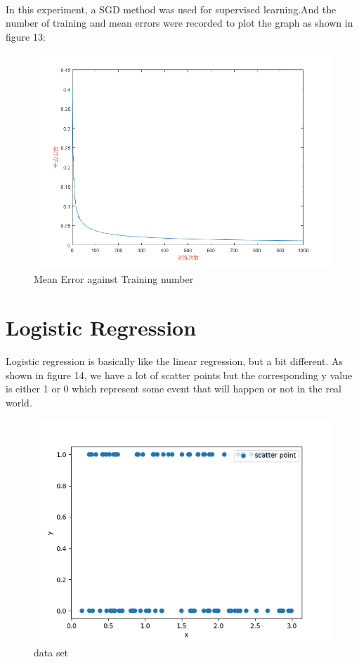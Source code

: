 \documentclass[a4paper,12pt]{article}
\begin{document}
\begin{spacing}{2}
\paragraph{ }In this experiment, a SGD method was used for supervised learning.And the number of training and mean errors were recorded to plot the graph as shown in figure 13:
\begin{figure}
\centering
\includegraphics[scale=0.5]{Figure_13.png}
\caption{Mean Error against Training number}
\label{Mean Errors against Training number}
\end{figure}
\section{Logistic Regression}
\paragraph{ }Logistic regression is basically like the linear regression, but a bit different. As shown in figure 14, we have a lot of scatter points but the corresponding y value is either 1 or 0 which represent some event that will happen or not in the real world.
\begin{figure}
\centering
\includegraphics[scale=0.5]{Figure_14.png}
\caption{data set}
\label{data set}
\end{figure}

\end{spacing}
\end{document}
